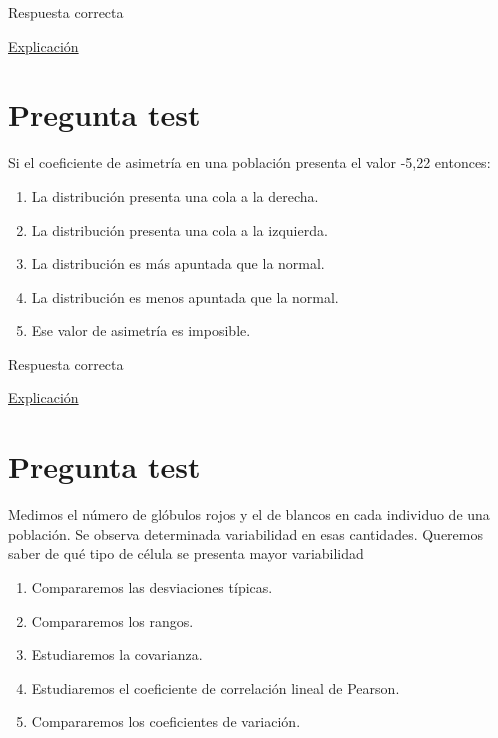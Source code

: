 \documentclass[
]{book}
\providecommand{\tightlist}{%
  \setlength{\itemsep}{0pt}\setlength{\parskip}{0pt}}
\begin{document}
Respuesta correcta

\href{https://1fjmanzano.github.io/bioestadistica/medidas-de-forma.html}{Explicación}

\hypertarget{pregunta-test-81}{%
\section{Pregunta test}\label{pregunta-test-81}}

Si el coeficiente de asimetría en una población presenta el valor -5,22 entonces:

\begin{enumerate}
\def\labelenumi{\alph{enumi})}
\tightlist
\item
  La distribución presenta una cola a la derecha.
\item
  La distribución presenta una cola a la izquierda.
\item
  La distribución es más apuntada que la normal.
\item
  La distribución es menos apuntada que la normal.
\item
  Ese valor de asimetría es imposible.
\end{enumerate}

Respuesta correcta

\href{https://1fjmanzano.github.io/bioestadistica/medidas-de-forma.html}{Explicación}

\hypertarget{pregunta-test-82}{%
\section{Pregunta test}\label{pregunta-test-82}}

Medimos el número de glóbulos rojos y el de blancos en cada individuo de una población. Se observa determinada variabilidad en esas cantidades. Queremos saber de qué tipo de célula se presenta mayor variabilidad

\begin{enumerate}
\def\labelenumi{\alph{enumi})}
\tightlist
\item
  Compararemos las desviaciones típicas.
\item
  Compararemos los rangos.
\item
  Estudiaremos la covarianza.
\item
  Estudiaremos el coeficiente de correlación lineal de Pearson.
\item
  Compararemos los coeficientes de variación.
\end{enumerate}
\end{document}
